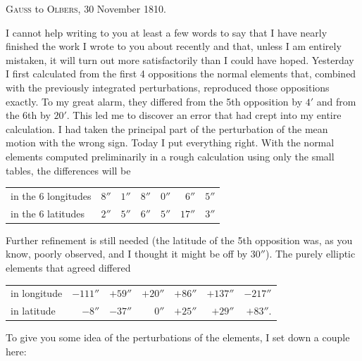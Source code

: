 \par\bigskip
\begin{center}
\textsc{Gauss} to \textsc{Olbers}, 30 November 1810.
\end{center}
\noindent\hspace*{\parindent}I cannot help writing to you at least a few words to say that I have nearly finished the work I wrote to you about recently and that, unless I am entirely mistaken, it will turn out more satisfactorily than I could have hoped. Yesterday I first calculated from the first 4 oppositions the normal elements that, combined with the previously integrated perturbations, reproduced those oppositions exactly. To my great alarm, they differed from the 5th opposition by \(4'\) and from the 6th by \(20'\). This led me to discover an error that had crept into my entire calculation. I had taken the principal part of the perturbation of the mean motion with the wrong sign. Today I put everything right. With the normal elements computed preliminarily in a rough calculation using only the small tables, the differences will be
\begin{center}\begingroup\small\setlength{\tabcolsep}{4pt}
\begin{tabular}{lrrrrrr}
in the 6 longitudes & \(8''\) & \(1''\) & \(8''\) & \(0''\) & \(6''\) & \(5''\)\\
in the 6 latitudes & \(2''\) & \(5''\) & \(6''\) & \(5''\) & \(17''\) & \(3''\)\\
\end{tabular}\endgroup\end{center}
Further refinement is still needed (the latitude of the 5th opposition was, as you know, poorly observed, and I thought it might be off by \(30''\)). The purely elliptic elements that agreed  differed
\begin{center}\begingroup\small\setlength{\tabcolsep}{4pt}
\begin{tabular}{lrrrrrr}
in longitude & \(-111''\) & \(+59''\) & \(+20''\) & \(+86''\) & \(+137''\) & \(-217''\)\\
in latitude & \(-8''\) & \(-37''\) & \(0''\) & \(+25''\) & \(+29''\) & \(+83''.\)\\
\end{tabular}\endgroup\end{center}
\par
\noindent\hspace*{\parindent}To give you some idea of the perturbations of the elements, I set down a couple here:
